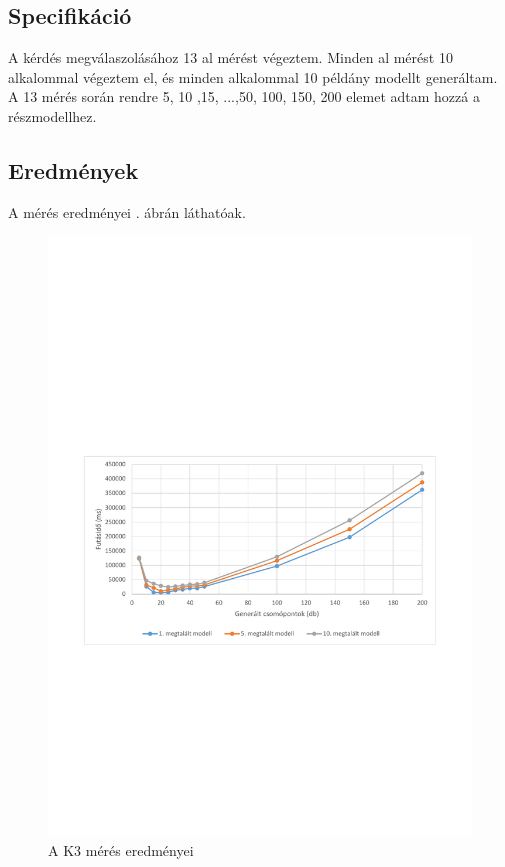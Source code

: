 \subsection{Specifikáció} 
A kérdés megválaszolásához 13 al mérést végeztem. Minden al mérést 10 alkalommal végeztem el, és minden alkalommal 10 példány modellt generáltam. A 13 mérés során rendre 5, 10 ,15, ...,50, 100, 150, 200 elemet adtam hozzá a részmodellhez.

\subsection{Eredmények}
A mérés eredményei . ábrán láthatóak.   

\begin{figure}
	\centering
	\includegraphics[width=1\textwidth]{figures/statisticsPlottal1}
	\caption{A K3 mérés eredményei}
	\label{fig:BmeresEredmeny}
\end{figure}

